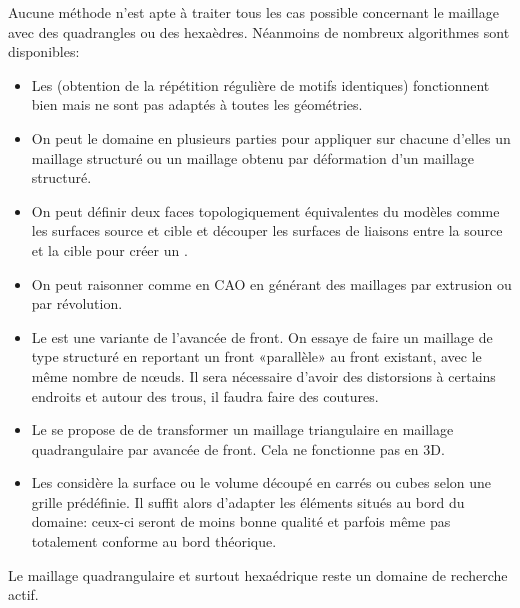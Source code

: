 \medskip
Aucune méthode n'est apte à traiter tous les cas possible concernant le maillage avec des quadrangles ou des hexaèdres. Néanmoins de nombreux algorithmes sont disponibles:
\begin{itemize}
   \item Les  (obtention de la répétition régulière de motifs identiques) fonctionnent bien mais ne sont pas adaptés à toutes les géométries.
   \item On peut  le domaine en plusieurs parties pour appliquer sur chacune d'elles un maillage structuré ou un maillage obtenu par déformation d'un maillage structuré.
   \item On peut définir deux faces topologiquement équivalentes du modèles comme les surfaces source et cible et découper les surfaces de liaisons entre la source et la cible pour créer un .
   \item On peut raisonner comme en CAO en générant des maillages par extrusion ou par révolution.
   \item Le  est une variante de l'avancée de front. On essaye de faire un maillage de type structuré en reportant un front «parallèle» au front existant, avec le même nombre de nœuds. Il sera nécessaire d'avoir des distorsions  à certains endroits et autour des trous, il faudra faire des coutures.
   \item Le  se propose de de transformer un maillage triangulaire en maillage quadrangulaire par avancée de front. Cela ne fonctionne pas en 3D.
   \item Les  considère la surface ou le volume découpé en carrés ou cubes selon une grille prédéfinie. Il suffit alors d'adapter les éléments situés au bord du domaine: ceux-ci seront de moins bonne qualité et parfois même pas totalement conforme au bord théorique.
\end{itemize}
Le maillage quadrangulaire et surtout hexaédrique reste un domaine de recherche actif.
